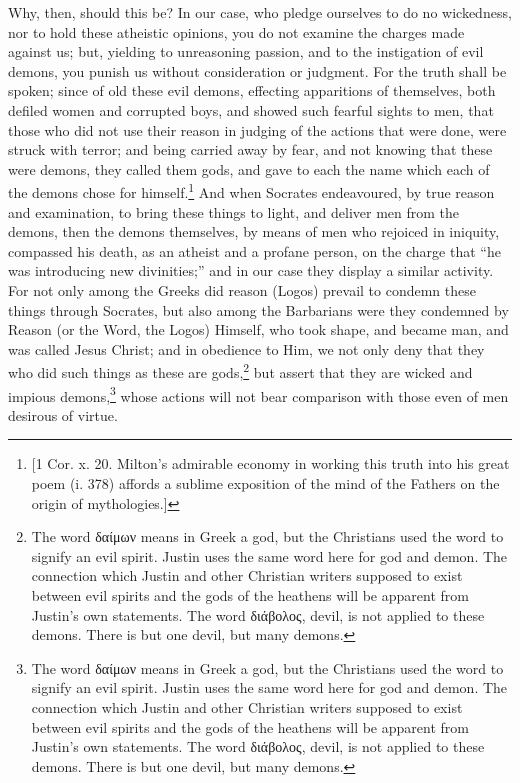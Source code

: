 
Why, then, should this be? In our case, who pledge ourselves to do no wickedness, nor to hold these atheistic opinions, you do not examine the charges made against us; but, yielding to unreasoning passion, and to the instigation of evil demons, you punish us without consideration or judgment. For the truth shall be spoken; since of old these evil demons, effecting apparitions of themselves, both defiled women and corrupted boys, and showed such fearful sights to men, that those who did not use their reason in judging of the actions that were done, were struck with terror; and being carried away by fear, and not knowing that these were demons, they called them gods, and gave to each the name which each of the demons chose for himself.\footnote{[1 Cor. x. 20. Milton’s admirable economy in working this truth into his great poem (i. 378) affords a sublime exposition of the mind of the Fathers on the origin of mythologies.]} And when Socrates endeavoured, by true reason and examination, to bring these things to light, and deliver men from the demons, then the demons themselves, by means of men who rejoiced in iniquity, compassed his death, as an atheist and a profane person, on the charge that “he was introducing new divinities;” and in our case they display a similar activity. For not only among the Greeks did reason (Logos) prevail to condemn these things through Socrates, but also among the Barbarians were they condemned by Reason (or the Word, the Logos) Himself, who took shape, and became man, and was called Jesus Christ; and in obedience to Him, we not only deny that they who did such things as these are gods,\footnote{The word \textgreek{δαίμων} means in Greek a god, but the Christians used the word to signify an evil spirit. Justin uses the same word here for god and demon. The connection which Justin and other Christian writers supposed to exist between evil spirits and the gods of the heathens will be apparent from Justin’s own statements. The word \textgreek{διάβολος}, devil, is not applied to these demons. There is but one devil, but many demons.} but assert that they are wicked and impious demons,\footnote{The word \textgreek{δαίμων} means in Greek a god, but the Christians used the word to signify an evil spirit. Justin uses the same word here for god and demon. The connection which Justin and other Christian writers supposed to exist between evil spirits and the gods of the heathens will be apparent from Justin’s own statements. The word \textgreek{διάβολος}, devil, is not applied to these demons. There is but one devil, but many demons.} whose actions will not bear comparison with those even of men desirous of virtue.

